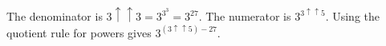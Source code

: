 The denominator is $3\uparrow\uparrow3=3^{3^3}=3^{27}$. The numerator is $3^{3\uparrow\uparrow5}$. Using the quotient rule for powers gives $\boxed{3^{(3\uparrow\uparrow5)-27}}$.
